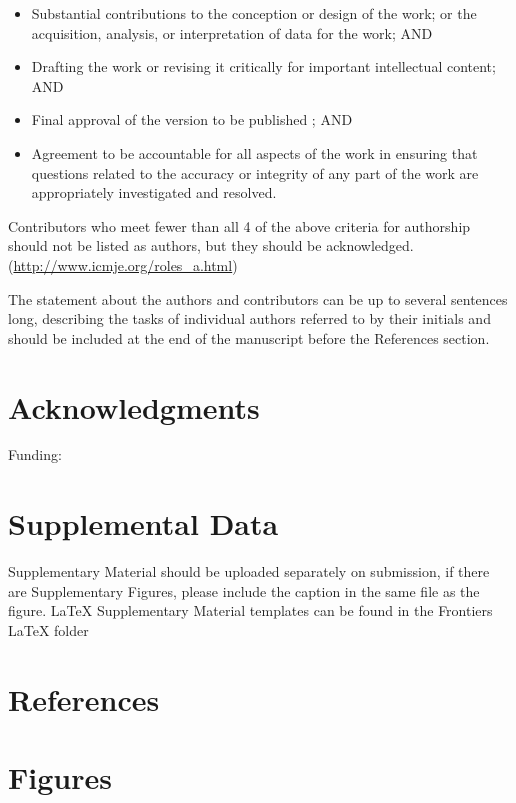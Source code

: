 \documentclass[]{article}
\providecommand{\tightlist}{%
  \setlength{\itemsep}{0pt}\setlength{\parskip}{0pt}}
\begin{document}
\begin{itemize}
\tightlist
\item
  Substantial contributions to the conception or design of the work; or the
  acquisition, analysis, or interpretation of data for the work; AND
\item
  Drafting the work or revising it critically for important intellectual
  content; AND
\item
  Final approval of the version to be published ; AND
\item
  Agreement to be accountable for all aspects of the work in ensuring that
  questions related to the accuracy or integrity of any part of the work are
  appropriately investigated and resolved.
\end{itemize}

Contributors who meet fewer than all 4 of the above criteria for authorship
should not be listed as authors, but they should be acknowledged.
(\url{http://www.icmje.org/roles_a.html})

The statement about the authors and contributors can be up to several sentences
long, describing the tasks of individual authors referred to by their initials
and should be included at the end of the manuscript before the References
section.

\hypertarget{acknowledgments}{%
\section*{Acknowledgments}\label{acknowledgments}}

Funding:

\hypertarget{supplemental-data}{%
\section{Supplemental Data}\label{supplemental-data}}

Supplementary Material should be uploaded separately on submission, if there are
Supplementary Figures, please include the caption in the same file as the
figure. LaTeX Supplementary Material templates can be found in the Frontiers
LaTeX folder

\hypertarget{references}{%
\section{References}\label{references}}

\hypertarget{figures}{%
\section*{Figures}\label{figures}}
\end{document}
